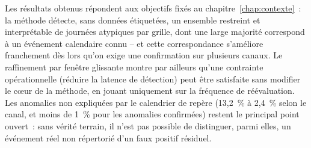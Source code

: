Les résultats obtenus répondent aux objectifs fixés au
chapitre~\ref{chap:contexte}~: la méthode détecte, sans données
étiquetées, un ensemble restreint et interprétable de journées
atypiques par grille, dont une large majorité correspond à un
événement calendaire connu -- et cette correspondance s'améliore
franchement dès lors qu'on exige une confirmation sur plusieurs
canaux. Le raffinement par fenêtre glissante montre par ailleurs
qu'une contrainte opérationnelle (réduire la latence de détection)
peut être satisfaite sans modifier le cœur de la méthode, en jouant
uniquement sur la fréquence de réévaluation. Les anomalies non
expliquées par le calendrier de repère (13,2~\% à 2,4~\% selon le
canal, et moins de 1~\% pour les anomalies confirmées) restent le
principal point ouvert~: sans vérité terrain, il n'est pas possible de
distinguer, parmi elles, un événement réel non répertorié d'un faux
positif résiduel.
